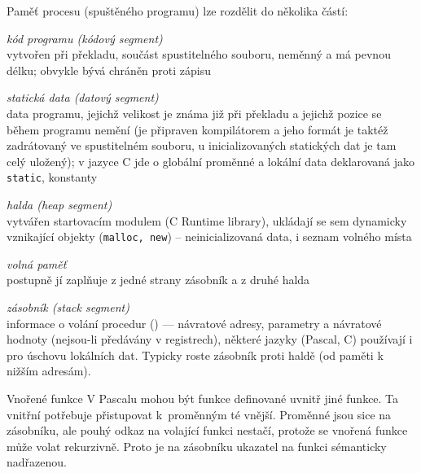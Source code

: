 Paměť procesu (spuštěného programu) lze rozdělit do několika částí:
\begin{pitemize}
	\item \emph{kód programu (kódový segment)} \\
vytvořen při překladu, součást spustitelného souboru, neměnný a má pevnou délku; obvykle bývá chráněn proti zápisu
	\item \emph{statická data (datový segment)} \\
data programu, jejichž velikost je známa již při překladu a jejichž pozice se během programu nemění (je připraven kompilátorem a jeho formát je taktéž zadrátovaný ve spustitelném souboru, u inicializovaných statických dat je tam celý uložený); v jazyce C jde o globální proměnné a lokální data deklarovaná jako \texttt{static}, konstanty
	\item \emph{halda (heap segment)} \\
vytvářen startovacím modulem (C Runtime library), ukládají se sem dynamicky vznikající objekty (\texttt{malloc, new}) -- neinicializovaná data, i seznam volného místa
	\item \emph{volná paměť} \\
postupně jí zaplňuje z jedné strany zásobník a z druhé halda
	\item \emph{zásobník (stack segment)} \\ 
informace o volání procedur () --- návratové adresy, parametry a návratové hodnoty (nejsou-li předávány v registrech), některé jazyky (Pascal, C) používají i pro úschovu lokálních dat. Typicky roste zásobník proti haldě (od  paměti k nižším adresám). 
\end{pitemize}


\begin{poznamkaN}{Vnořené funkce}
V Pascalu mohou být funkce definované uvnitř jiné funkce. Ta vnitřní potřebuje přistupovat k~proměnným té vnější. Proměnné jsou sice na zásobníku, ale pouhý odkaz na volající funkci nestačí, protože se vnořená funkce může volat rekurzivně. Proto je na zásobníku ukazatel na funkci sémanticky nadřazenou.
\end{poznamkaN}

